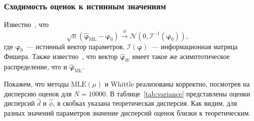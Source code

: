 \documentclass[specialist,
substylefile = spbu_report.rtx,
subf,12pt]{disser}
\theoremstyle{definition}
\begin{document}

\subsubsection{Сходимость оценок к истинным значениям}
Известно~\cite[Theorem 8.1]{Hassler2018}, что
\begin{equation}\label{eq:mle_distribution}
	\sqrt{n}(\widehat{\bm\varphi}_\mathrm{ML} - \bm\varphi_0)\overset{d}{\longrightarrow} \mathcal{N}(0, \mathcal{I}^{-1}(\bm{\varphi}_0)),
\end{equation}
где $\bm\varphi_0$~--- истинный вектор параметров, $\mathcal{I}(\bm\varphi)$~--- информационная матрица Фишера. Также известно~\cite[Proposition 8.3]{Hassler2018}, что вектор $\widehat{\bm\varphi}_W$ имеет такое же асимптотическое распределение, что и $\widehat{\bm\varphi}_\mathrm{ML}$.

Покажем, что методы $\mathrm{MLE}(\mu)$ и Whittle реализованы корректно, посмотрев на дисперсию оценок для $N=10000$. В таблице~\ref{tab:variance} представлены оценки дисперсий $\hat d$ и $\hat \phi$, в скобках указана теоретическая дисперсия. Как видим, для разных значений параметров значение дисперсий оценок близки к теоретическим.
\end{document}
